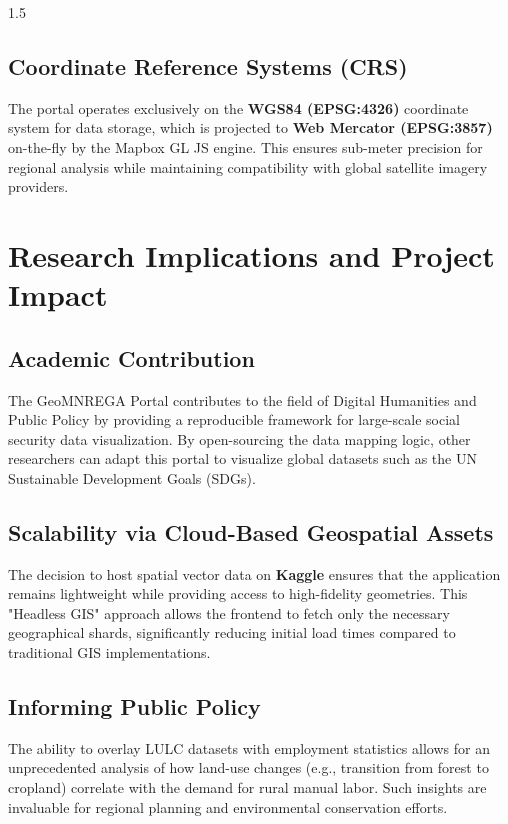 \documentclass[12pt,a4paper]{report}
\begin{document}
\begin{spacing}{1.5}
\section{Coordinate Reference Systems (CRS)}
The portal operates exclusively on the \textbf{WGS84 (EPSG:4326)} coordinate system for data storage, which is projected to \textbf{Web Mercator (EPSG:3857)} on-the-fly by the Mapbox GL JS engine. This ensures sub-meter precision for regional analysis while maintaining compatibility with global satellite imagery providers.

\chapter{Research Implications and Project Impact}

\section{Academic Contribution}
The GeoMNREGA Portal contributes to the field of Digital Humanities and Public Policy by providing a reproducible framework for large-scale social security data visualization. By open-sourcing the data mapping logic, other researchers can adapt this portal to visualize global datasets such as the UN Sustainable Development Goals (SDGs).

\section{Scalability via Cloud-Based Geospatial Assets}
The decision to host spatial vector data on \textbf{Kaggle} ensures that the application remains lightweight while providing access to high-fidelity geometries. This "Headless GIS" approach allows the frontend to fetch only the necessary geographical shards, significantly reducing initial load times compared to traditional GIS implementations.

\section{Informing Public Policy}
The ability to overlay LULC datasets with employment statistics allows for an unprecedented analysis of how land-use changes (e.g., transition from forest to cropland) correlate with the demand for rural manual labor. Such insights are invaluable for regional planning and environmental conservation efforts.


\end{spacing}
\end{document}
